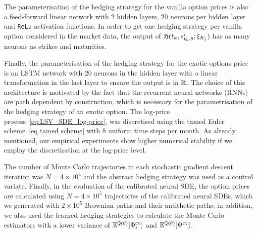 The parameterisation of the hedging strategy for the vanilla option prices is also a feed-forward
linear network with 2 hidden layers, 20 neurons per hidden layer and \texttt{ReLu} activation functions. In order to get one hedging strategy per vanilla option 
considered in the market data, the output of $\mathfrak{H}(t_k, s_{t_k, \theta}^{i}; \xi_{K_j})$ has as many neurons as strikes and maturities.

Finally, the parameterisation of the hedging strategy for the exotic options price is an LSTM network \cite{Hochreiter1997LongMemory} with 20 neurons in the hidden layer with a linear transformation in the last layer to ensure the output is in $\mathbb{R}$. The choice of this architecture is motivated by the fact that the recurrent neural networks (RNNs) are path dependent by construction, which is necessary for the parametrisation of the hedging strategy of an exotic option. 
The log-price process~\eqref{eq:LSV_SDE_log-price}, was discretised using the tamed Euler scheme~\eqref{eq tamed scheme} with 8 uniform time steps per month. As already mentioned, our empirical experiments show higher numerical stability if we employ the discretisation at the log-price level.
 
The number of Monte Carlo trajectories in each stochastic gradient descent iteration was $N=4\times 10^4$ and the abstract hedging strategy was used as a control variate. Finally, in the evaluation of the calibrated neural SDE, the option prices are calculated using $N = 4\times 10^5$ trajectories of the calibrated neural SDEs, which we generated with $2\times 10^5$ Brownian paths and their antithetic paths; in addition, we also used the learned hedging strategies to calculate the Monte Carlo estimators with a lower variance of $\mathbb{E}^{\mathbb{Q}(\theta)}[\Phi_i^{\textup{cv}}]$ and $\mathbb{E}^{\mathbb{Q}(\theta)}[\Psi^{\textup{cv}}]$.          

